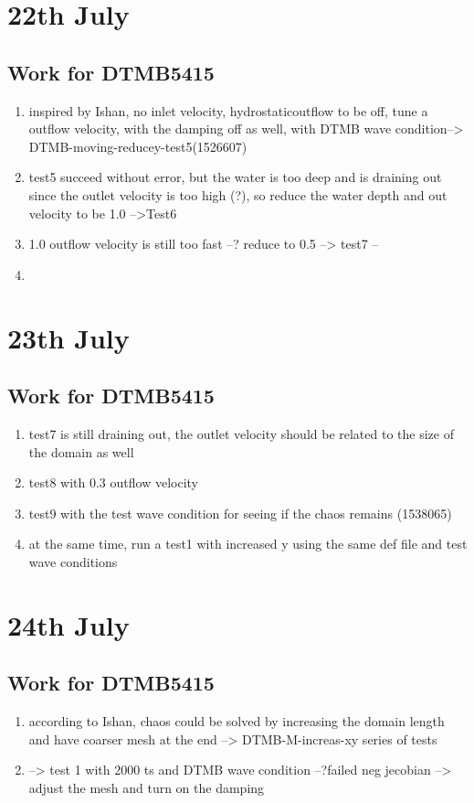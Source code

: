 \documentclass[12pt]{article} %
\begin{document}
\section{22th July}
\subsection{Work for DTMB5415}
\begin{enumerate}
    \item inspired by Ishan, no inlet velocity, hydrostaticoutflow to be off, tune a outflow velocity, with the damping off as well, with DTMB wave condition--> DTMB-moving-reducey-test5(1526607)
    \item test5 succeed without error, but the water is too deep and is draining out since the outlet velocity is too high (?), so reduce the water depth and out velocity to be 1.0 -->Test6
    \item 1.0 outflow velocity is still too fast --? reduce to 0.5 --> test7 --
    \item 
\end{enumerate}
\section{23th July}
\subsection{Work for DTMB5415}
\begin{enumerate}
    \item test7 is still draining out, the outlet velocity should be related to the size of the domain as well
    \item test8 with 0.3 outflow velocity 
    \item test9 with the test wave condition for seeing if the chaos remains (1538065)
    \item at the same time, run a test1 with increased y using the same def file and test wave conditions
\end{enumerate}
\section{24th July}
\subsection{Work for DTMB5415}
\begin{enumerate}
    \item according to Ishan, chaos could be solved by increasing the domain length and have coarser mesh at the end --> DTMB-M-increas-xy series of tests
    \item --> test 1 with 2000 ts and DTMB wave condition --?failed neg jecobian --> adjust the mesh and turn on the damping
\end{enumerate}
\end{document}
